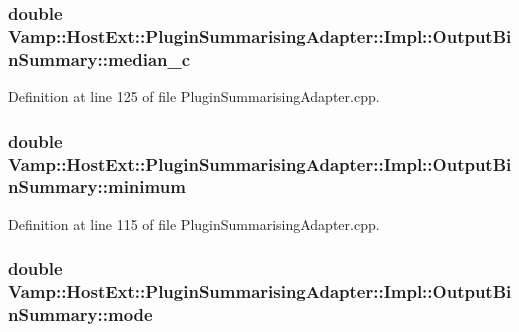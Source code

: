 \subsubsection[{\texorpdfstring{median\+\_\+c}{median_c}}]{\setlength{\rightskip}{0pt plus 5cm}double Vamp\+::\+Host\+Ext\+::\+Plugin\+Summarising\+Adapter\+::\+Impl\+::\+Output\+Bin\+Summary\+::median\+\_\+c}\hypertarget{struct_vamp_1_1_host_ext_1_1_plugin_summarising_adapter_1_1_impl_1_1_output_bin_summary_ab27947866f2e8199e8e9831483ced617}{}\label{struct_vamp_1_1_host_ext_1_1_plugin_summarising_adapter_1_1_impl_1_1_output_bin_summary_ab27947866f2e8199e8e9831483ced617}


Definition at line 125 of file Plugin\+Summarising\+Adapter.\+cpp.

\subsubsection[{\texorpdfstring{minimum}{minimum}}]{\setlength{\rightskip}{0pt plus 5cm}double Vamp\+::\+Host\+Ext\+::\+Plugin\+Summarising\+Adapter\+::\+Impl\+::\+Output\+Bin\+Summary\+::minimum}\hypertarget{struct_vamp_1_1_host_ext_1_1_plugin_summarising_adapter_1_1_impl_1_1_output_bin_summary_a76d3b75daae008a94a962ed4ffb26c9b}{}\label{struct_vamp_1_1_host_ext_1_1_plugin_summarising_adapter_1_1_impl_1_1_output_bin_summary_a76d3b75daae008a94a962ed4ffb26c9b}


Definition at line 115 of file Plugin\+Summarising\+Adapter.\+cpp.

\subsubsection[{\texorpdfstring{mode}{mode}}]{\setlength{\rightskip}{0pt plus 5cm}double Vamp\+::\+Host\+Ext\+::\+Plugin\+Summarising\+Adapter\+::\+Impl\+::\+Output\+Bin\+Summary\+::mode}\hypertarget{struct_vamp_1_1_host_ext_1_1_plugin_summarising_adapter_1_1_impl_1_1_output_bin_summary_aaa961ce6d50e72437b60813db8522af4}{}\label{struct_vamp_1_1_host_ext_1_1_plugin_summarising_adapter_1_1_impl_1_1_output_bin_summary_aaa961ce6d50e72437b60813db8522af4}


